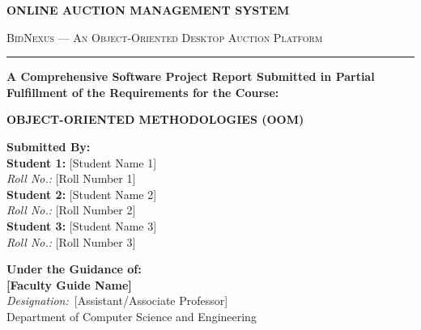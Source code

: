 \documentclass[12pt,a4paper]{article}
\begin{document}
\begin{titlepage}
    \centering
    \vspace*{0.5cm}
    
    {\Huge \bfseries ONLINE AUCTION MANAGEMENT SYSTEM\par}
    \vspace{0.4cm}
    {\Large \textsc{BidNexus --- An Object-Oriented Desktop Auction Platform}\par}
    
    \vspace{1.2cm}
    \rule{0.8\textwidth}{1.5pt}\par
    \vspace{0.8cm}
    
    {\large \textbf{A Comprehensive Software Project Report Submitted in Partial Fulfillment of the Requirements for the Course:}\par}
    \vspace{0.3cm}
    {\Large \textbf{OBJECT-ORIENTED METHODOLOGIES (OOM)}\par}
    
    \vspace{1.2cm}
    
    \begin{minipage}{0.48\textwidth}
        \begin{flushleft} \large
            \textbf{Submitted By:}\\[0.2cm]
            \textbf{Student 1:} [Student Name 1] \\
            \textit{Roll No.:} [Roll Number 1]\\[0.15cm]
            \textbf{Student 2:} [Student Name 2] \\
            \textit{Roll No.:} [Roll Number 2]\\[0.15cm]
            \textbf{Student 3:} [Student Name 3] \\
            \textit{Roll No.:} [Roll Number 3]
        \end{flushleft}
    \end{minipage}
    \begin{minipage}{0.48\textwidth}
        \begin{flushright} \large
            \textbf{Under the Guidance of:}\\[0.2cm]
            \textbf{[Faculty Guide Name]}\\
            \textit{Designation:}\ [Assistant/Associate Professor]\\
            Department of Computer Science and Engineering
        \end{flushright}
    \end{minipage}
    

\end{titlepage}
\end{document}
